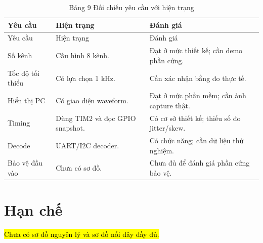 \begin{longtable}[]{@{}
  >{\raggedright\arraybackslash}p{}
  >{\raggedright\arraybackslash}p{}
  >{\raggedright\arraybackslash}p{}@{}}
\caption{Bảng 9 Đối chiếu yêu cầu với hiện trạng}\tabularnewline
\toprule\noalign{}
\begin{minipage}[b]{\linewidth}\raggedright
Yêu cầu
\end{minipage} & \begin{minipage}[b]{\linewidth}\raggedright
Hiện trạng
\end{minipage} & \begin{minipage}[b]{\linewidth}\raggedright
Đánh giá
\end{minipage} \\
\midrule\noalign{}
\endfirsthead
\toprule\noalign{}
\begin{minipage}[b]{\linewidth}\raggedright
Yêu cầu
\end{minipage} & \begin{minipage}[b]{\linewidth}\raggedright
Hiện trạng
\end{minipage} & \begin{minipage}[b]{\linewidth}\raggedright
Đánh giá
\end{minipage} \\
\midrule\noalign{}
\endhead
\bottomrule\noalign{}
\endlastfoot
Số kênh & Cấu hình 8 kênh. & Đạt ở mức thiết kế; cần demo phần cứng. \\
Tốc độ tối thiểu & Có lựa chọn 1 kHz. & Cần xác nhận bằng đo thực tế. \\
Hiển thị PC & Có giao diện waveform. & Đạt ở mức phần mềm; cần ảnh capture thật. \\
Timing & Dùng TIM2 và đọc GPIO snapshot. & Có cơ sở thiết kế; thiếu số đo jitter/skew. \\
Decode & UART/I2C decoder. & Có chức năng; cần dữ liệu thử nghiệm. \\
Bảo vệ đầu vào & Chưa có sơ đồ. & Chưa đủ để đánh giá phần cứng bảo vệ. \\
\end{longtable}

\section{Hạn chế}\label{hux1ea1n-chux1ebf}

\hl{Chưa có sơ đồ nguyên lý và sơ đồ nối dây đầy đủ.}

